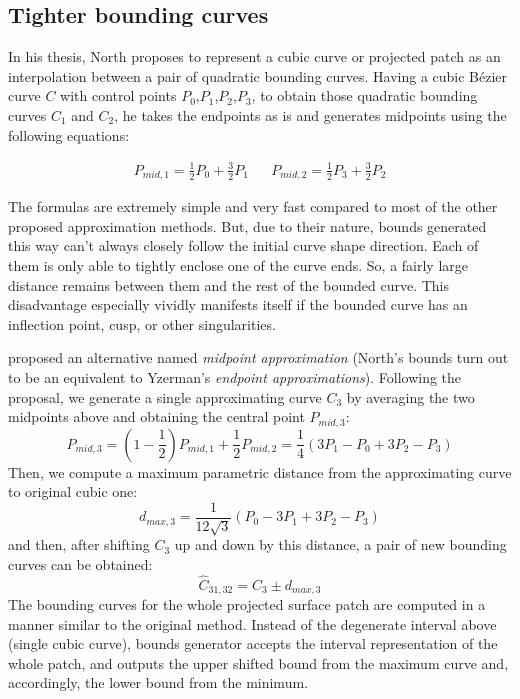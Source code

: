 \documentclass{jcgt}
\begin{document}
\subsection{Tighter bounding curves}
In his thesis\cite{NORTH07}, North proposes to represent a cubic curve or projected patch as an interpolation between a pair of quadratic bounding curves. Having a cubic Bézier curve $C$ with control points $P_{0}$,$P_{1}$,$P_{2}$,$P_{3}$, to obtain those quadratic bounding curves $C_{1}$ and $C_{2}$, he takes the endpoints as is and generates midpoints using the following equations:

\begin{align*}
P_{mid,1}=\frac{1}{2}P_0+\frac{3}{2}P_1
&&
P_{mid,2}=\frac{1}{2}P_3+\frac{3}{2}P_2
\end{align*}

The formulas are extremely simple and very fast compared to most of the other proposed approximation methods. But, due to their nature, bounds generated this way can't always closely follow the initial curve shape direction. Each of them is only able to tightly enclose one of the curve ends. So, a fairly large distance remains between them and the rest of the bounded curve. This disadvantage especially vividly manifests itself if the bounded curve has an inflection point, cusp, or other singularities.

\cite{Yzerman20simplify} proposed an alternative named \emph{midpoint approximation} (North's bounds turn out to be an equivalent to Yzerman's \emph{endpoint approximations}). Following the proposal, we generate a single approximating curve $C_3$ by averaging the two midpoints above and obtaining the central point $P_{mid,3}$:
\[
P_{mid,3} = \left(1 - \frac{1}{2}\right)P_{mid,1}+\frac{1}{2}P_{mid,2} = \frac{1}{4}\left(3P_1-P_0+3P_2-P_3\right)
\]
Then, we compute a maximum parametric distance from the approximating curve to original cubic one:
\[
d_{max,3}=\frac{1}{12\sqrt{3}}\left(P_0-3P_1+3P_2-P_3\right)
\]
and then, after shifting $C_{3}$ up and down by this distance, a pair of new bounding curves can be obtained:
\[
{\hat{C}}_{31,32}=C_3 \pm d_{max,3}
\]
The bounding curves for the whole projected surface patch are computed in a manner similar to the original method. Instead of the degenerate interval above (single cubic curve), bounds generator accepts the interval representation of the whole patch, and outputs the upper shifted bound from the maximum curve and, accordingly, the lower bound from the minimum.
\end{document}
